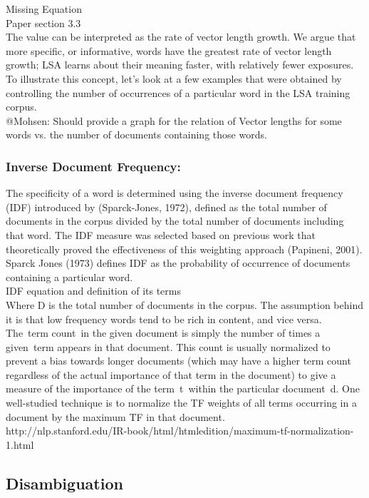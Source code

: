 Missing Equation\\
Paper section 3.3\\
The value can be interpreted as the rate of vector length growth. We argue that more specific, or informative, words have the greatest rate of vector length growth; LSA learns about their meaning faster, with relatively fewer exposures. To illustrate this concept, let's look at a few examples that were obtained by controlling the number of occurrences of a particular word in the LSA training corpus. \\
@Mohsen: Should provide a graph for the relation of Vector lengths for some words vs. the number of documents containing those words.\\

\subsubsection{Inverse Document Frequency:}
The specificity of a word is determined using the inverse document frequency (IDF) introduced by (Sparck-Jones, 1972), defined as the total number of documents in the corpus divided by the total number of documents including that word. The IDF measure was selected based on previous work that theoretically proved the effectiveness of this weighting approach (Papineni, 2001). Sparck Jones (1973) defines IDF as the probability of occurrence of documents containing a particular word.\\
IDF equation and definition of its terms\\
Where D is the total number of documents in the corpus. The assumption behind it is that low frequency words tend to be rich in content, and vice versa.
The term count in the given document is simply the number of times a given term appears in that document. This count is usually normalized to prevent a bias towards longer documents (which may have a higher term count regardless of the actual importance of that term in the document) to give a measure of the importance of the term t within the particular document d. One well-studied technique is to normalize the TF weights of all terms occurring in a document by the maximum TF in that document.\\
http://nlp.stanford.edu/IR-book/html/htmledition/maximum-tf-normalization-1.html
\subsection{Disambiguation}
                                             
